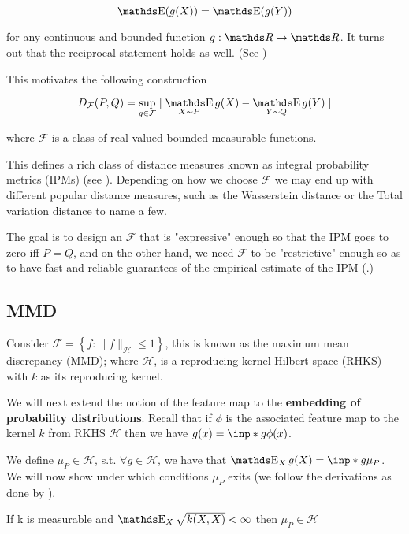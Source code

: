 $$
\E(g(X)) = \E(g(Y))
$$

for any continuous and bounded function $g : \R \rightarrow \R$. 
It turns out that the reciprocal statement holds as well. (See \cite{TwoSampleTestGrettonBernhard})

This motivates the following construction

$$
D_\mathcal{F} (P, Q) = 
\sup _{g \in \mathcal{F}} \mid \mathop{\E}_{X \sim P} g(X) - \mathop{\E}_{Y \sim Q} g(Y) \mid
$$

where $\mathcal{F}$ is a class of real-valued bounded measurable functions.


This defines a rich class of distance measures known as 
integral probability metrics (IPMs) (see \cite{muller1997integral}). Depending
on how we choose $\mathcal{F}$ we may end up with different popular distance measures, such as
the Wasserstein distance or the Total variation distance to name a few. 

The goal is to design an $\mathcal{F}$ that is "expressive" enough so that the IPM goes to zero iff $P = Q$,
and on the other hand, we need $\mathcal{F}$ to be "restrictive" enough so as to have fast and 
reliable guarantees of the empirical estimate of the IPM (\cite{TwoSampleTestGrettonBernhard}.)


\subsection{MMD}

Consider $\mathcal{F}=\left\{f:\|f\|_{\mathcal{H}} \leq 1\right\}$, this is known
as the maximum mean discrepancy (MMD); where $\mathcal{H}$, is a reproducing kernel Hilbert space 
(RHKS) with $k$ as its reproducing kernel. 

We will next extend the notion of the feature map to the \textbf{embedding of probability distributions}. 
Recall that if $\phi$ is the associated feature map to the kernel $k$ from 
RKHS $\mathcal{H}$ then we have $g(x) = \inp*{g}{\phi(x)}$.

We define $\mu_P \in \mathcal{H}$, s.t. $\forall g \in \mathcal{H}$, we have that
$\mathop{\E}_{X} g(X) = \inp*{g}{\mu_P}$. We will now show under which conditions $\mu_P$ exits
(we follow the derivations as done by \cite{Peters2008diploma}).

\begin{lemma}\label{embedding_existance}
    If k is measurable and $\mathop{\E}_{X} \sqrt{k(X, X)} < \infty$ then
    $\mu_P \in \mathcal{H}$
\end{lemma}

